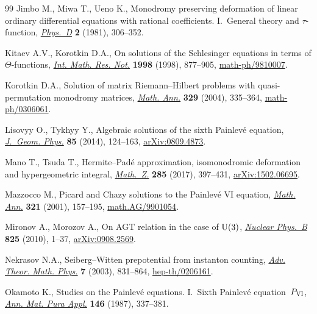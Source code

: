 \documentclass[pdftex]{sigma}
\numberwithin{equation}{section}
\begin{document}
\begin{thebibliography}{99}
Jimbo M., Miwa T., Ueno K., Monodromy preserving deformation of linear ordinary
 differential equations with rational coefficients. {I}.~{G}eneral theory and
 {$\tau $}-function, \href{https://doi.org/10.1016/0167-2789(81)90013-0}{\textit{Phys.~D}} \textbf{2} (1981), 306--352.

Kitaev A.V., Korotkin D.A., On solutions of the {S}chlesinger equations in
 terms of {$\Theta$}-functions, \href{https://doi.org/10.1155/S1073792898000543}{\textit{Int. Math. Res. Not.}} \textbf{1998}
 (1998), 877--905, \href{https://arxiv.org/abs/math-ph/9810007}{math-ph/9810007}.

Korotkin D.A., Solution of matrix {R}iemann--{H}ilbert problems with
 quasi-permutation monodromy matrices, \href{https://doi.org/10.1007/s00208-004-0528-z}{\textit{Math. Ann.}} \textbf{329}
 (2004), 335--364, \href{https://arxiv.org/abs/math-ph/0306061}{math-ph/0306061}.

Lisovyy O., Tykhyy Y., Algebraic solutions of the sixth {P}ainlev\'{e}
 equation, \href{https://doi.org/10.1016/j.geomphys.2014.05.010}{\textit{J.~Geom. Phys.}} \textbf{85} (2014), 124--163,
 \href{https://arxiv.org/abs/0809.4873}{arXiv:0809.4873}.

Mano T., Tsuda T., Hermite--{P}ad\'{e} approximation, isomonodromic deformation
 and hypergeometric integral, \href{https://doi.org/10.1007/s00209-016-1713-y}{\textit{Math.~Z.}} \textbf{285} (2017), 397--431,
 \href{https://arxiv.org/abs/1502.06695}{arXiv:1502.06695}.

Mazzocco M., Picard and {C}hazy solutions to the {P}ainlev\'{e} {VI} equation,
 \href{https://doi.org/10.1007/PL00004500}{\textit{Math. Ann.}} \textbf{321} (2001), 157--195, \href{https://arxiv.org/abs/math.AG/9901054}{math.AG/9901054}.

Mironov A., Morozov A., On {AGT} relation in the case of {${\rm U}(3)$},
 \href{https://doi.org/10.1016/j.nuclphysb.2009.09.011}{\textit{Nuclear Phys.~B}} \textbf{825} (2010), 1--37, \href{https://arxiv.org/abs/arXiv:0908.2569}{arXiv:0908.2569}.

Nekrasov N.A., Seiberg--{W}itten prepotential from instanton counting,
 \href{https://doi.org/10.4310/ATMP.2003.v7.n5.a4}{\textit{Adv. Theor. Math. Phys.}} \textbf{7} (2003), 831--864,
 \href{https://arxiv.org/abs/hep-th/0206161}{hep-th/0206161}.

Okamoto K., Studies on the {P}ainlev\'{e} equations. {I}.~{S}ixth
 {P}ainlev\'{e} equation~{$P_{{\rm VI}}$}, \href{https://doi.org/10.1007/BF01762370}{\textit{Ann. Mat. Pura Appl.}}
 \textbf{146} (1987), 337--381.


\end{thebibliography}
\end{document}
